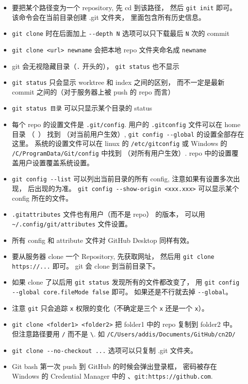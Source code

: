 \begin{itemize}
\item 要把某个路径变为一个 repository, 先 cd 到该路径， 然后 \verb|git init| 即可。 该命令会在当前目录创建 .git 文件夹， 里面包含所有历史信息。
\item \verb|git clone| 时在后面加上 \verb|--depth N| 选项可以只下载最后 \verb|N| 次的 commit
\item \verb|git clone <url> newname| 会把本地 repo 文件夹命名成 \verb|newname|
\item git 会无视隐藏目录（\verb|.| 开头的）， \verb|git status| 也不显示
\item \verb|git status| 只会显示 worktree 和 index 之间的区别， 而不一定是最新 commit 之间的（对于服务器上被 push 的 repo 而言）
\item \verb|git status 目录| 可以只显示某个目录的 status
\item 每个 repo 的设置文件是 \verb|.git/config|. 用户的 \verb|.gitconfig| 文件可以在 home 目录 （~） 找到 （对当前用户生效）, \verb|git config --global| 的设置全部存在这里。 系统的设置文件可以在 linux 的 \verb|/etc/gitconfig| 或 Windows 的 \verb|/C/ProgramData/Git/config| 中找到 （对所有用户生效）. repo 中的设置覆盖用户设置覆盖系统设置。
\item \verb|git config --list| 可以列出当前目录的所有 config, 注意如果有设置多次出现， 后出现的为准。 \verb|git config --show-origin <xxx.xxx>| 可以显示某个 config 所在的文件。
\item \verb|.gitattributes| 文件也有用户（而不是 repo） 的版本， 可以用 \verb|~/.config/git/attributes| 文件设置。
\item 所有 config 和 attribute 文件对 GitHub Desktop 同样有效。
\item 要从服务器 clone 一个 Repository, 先获取网址， 然后用 \verb|git clone https://...| 即可。 git 会 clone 到当前目录下。
\item 如果 clone 了以后用 \verb|git status| 发现所有的文件都改变了， 用 \verb|git config --global core.fileMode false| 即可。 如果还是不行就去掉 \verb|--global|。
\item 注意 \verb|git| 只会追踪 \verb|x| 权限的变化（不确定是三个 \verb|x| 还是一个 \verb|x|）。
\item \verb|git clone <folder1> <folder2>| 把 folder1 中的 repo 复制到 folder2 中。 但注意路径要用 \verb|/| 而不是 \verb|\|. 如 \verb|/C/Users/addis/Documents/GitHub/cn2D/|
\item \verb|git clone --no-checkout ...| 选项可以只复制 .git 文件夹。
\item Git bash 第一次 push 到 GitHub 的时候会弹出登录框， 密码被存在 Windows 的 Credential Manager 中的 、\verb|git:https://github.com|.

\end{itemize}
